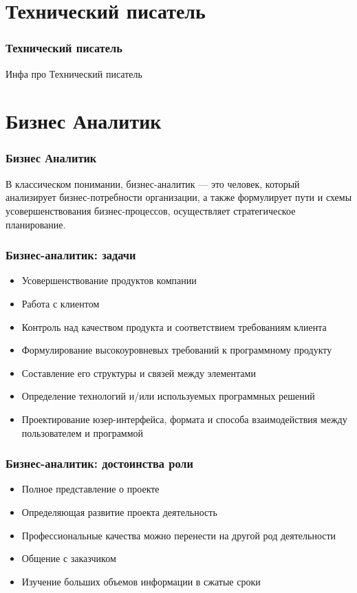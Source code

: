 \documentclass{../industrial-development}
\begin{document}
	
	\section{Технический писатель }
	
	\begin{frame} \frametitle{Технический писатель}
		\begin{block}{}
			\alert {}Инфа про Технический писатель
		\end{block}
		
	\end{frame}
	
	\section{Бизнес Аналитик}
	
	\begin{frame} \frametitle{Бизнес Аналитик}
		\begin{block}{}
			\alert {}В классическом понимании, {бизнес-аналитик} — это человек, который анализирует бизнес-потребности организации, а также формулирует пути и схемы усовершенствования бизнес-процессов, осуществляет стратегическое планирование. 
		\end{block}
		
	\end{frame}
	
	\begin{frame} \frametitle{Бизнес-аналитик: задачи}
		\begin{itemize}
			\item Усовершенствование продуктов компании
			\item Работа с клиентом
			\item Контроль над качеством продукта и соответствием требованиям клиента
			\item Формулирование высокоуровневых требований к программному продукту
			\item Составление его структуры и связей между элементами
			\item Определение технологий и/или используемых программных решений
			\item Проектирование юзер-интерфейса, формата и способа взаимодействия между пользователем и программой
		\end{itemize}
	\end{frame}
	
	\begin{frame} \frametitle{Бизнес-аналитик: достоинства роли}
		\begin{itemize}
			\item Полное представление о проекте
			\item Определяющая развитие проекта деятельность
			\item Профессиональные качества можно перенести на другой род деятельности
			\item Общение с заказчиком
			\item Изучение больших объемов информации в сжатые сроки
		\end{itemize}
	\end{frame}
	
\end{document}
